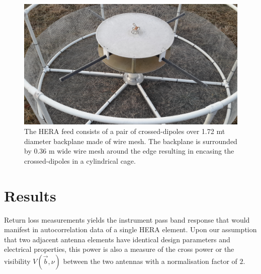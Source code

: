 \documentclass[twocolumn]{emulateapj}
\newcommand{\vis}{{V}}
\begin{document}
\begin{figure}
\centering
\includegraphics[trim={2cm 10cm 20cm 5cm},clip, totalheight=0.3\textheight]{plots/herafeed.jpg}
\vspace{1.0 em}
\caption{The HERA feed consists of a pair of crossed-dipoles over 1.72 mt diameter backplane made of wire mesh. The backplane is surrounded by 0.36 m wide wire mesh around the edge resulting in encasing the crossed-dipoles in a cylindrical cage.}
\label{fig:herafeed}
\end{figure}


\section{Results}
Return loss measurements yields the instrument pass band response that would manifest in autocorrelation data of a single HERA element. Upon our assumption that two adjacent antenna elements have identical design parameters and electrical properties, this power is also a measure of the cross power or the visibility $\vis (\vec b, \nu)$ between the two antennas with a normalisation factor of $2$. 
\end{document}
